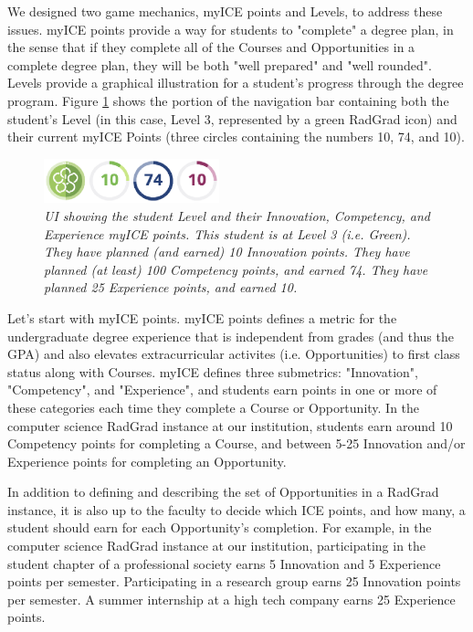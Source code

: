 \documentclass[acmsmall]{acmart}
\begin{document}
We designed two game mechanics, myICE points and Levels, to address these issues.  myICE points provide a way for students to "complete" a degree plan, in the sense that if they complete all of the Courses and Opportunities in a complete degree plan, they will be both "well prepared" and "well rounded".  Levels provide a graphical illustration for a student's progress through the degree program. Figure \ref{fig:ice} shows the portion of the navigation bar containing both the student's Level (in this case, Level 3, represented by a green RadGrad icon) and their current myICE Points (three circles containing the numbers 10, 74, and 10).

\begin{figure}[t]
\centering
\includegraphics[width=2in]{images/ice-pane.eps}
\caption{\em UI showing the student Level and their Innovation, Competency, and Experience myICE points. This student is at Level 3 (i.e. Green). They have planned (and earned) 10 Innovation points. They have planned (at least) 100 Competency points, and earned 74. They have planned 25 Experience points, and earned 10.  }
\label{fig:ice}
\end{figure}

Let's start with myICE points.  myICE points defines a metric for the undergraduate degree experience that is independent from grades (and thus the GPA) and also elevates extracurricular activites (i.e. Opportunities) to first class status along with Courses. myICE defines three submetrics: "Innovation", "Competency", and "Experience", and students earn points in one or more of these categories each time they complete a Course or Opportunity. In the computer science RadGrad instance at our institution, students earn around 10 Competency points for completing a Course, and between 5-25 Innovation and/or Experience points for completing an Opportunity.

In addition to defining and describing the set of Opportunities in a RadGrad instance, it is also up to the faculty to decide which ICE points, and how many, a student should earn for each Opportunity's completion. For example, in the computer science RadGrad instance at our institution, participating in the student chapter of a professional society earns 5 Innovation and 5 Experience points per semester.  Participating in a research group earns 25 Innovation points per semester.  A summer internship at a high tech company earns 25 Experience points.
\end{document}
